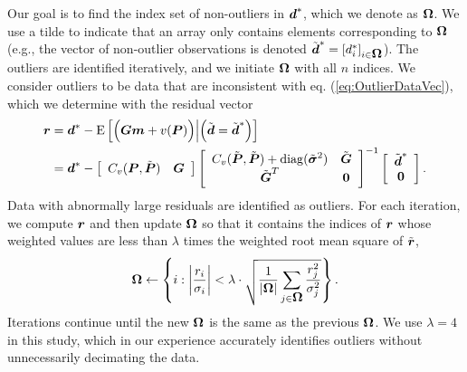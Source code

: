 \documentclass[extra,mreferee]{gji}
\begin{document}
Our goal is to find the index set of non-outliers in $\mitbf{d}^*$, which we denote as $\mitbf{\Omega}$. We use a tilde to indicate that an array only contains elements corresponding to $\mitbf{\Omega}$ (e.g., the vector of non-outlier observations is denoted $\tilde{\mitbf{d}}^* = [d_i^*]_{i \in \mitbf{\Omega}}$). The outliers are identified iteratively, and we initiate $\mitbf{\Omega}$ with all $n$ indices. We consider outliers to be data that are inconsistent with eq. (\ref{eq:OutlierDataVec}), which we determine with the residual vector 
\begin{align}\label{eq:Residual}
\mitbf{r} &= \mitbf{d}^* - \mathrm{E}\left[\Big(\mitbf{G}\mitbf{m} + v(\mitbf{P})\Big) \Big| \Big(\tilde{\mitbf{d}} = \tilde{\mitbf{d}}^*\Big)\right] \\
          &= \mitbf{d}^*  - 
            \left[\begin{array}{cc}
                  C_v(\mitbf{P},\tilde{\mitbf{P}}) & \mitbf{G} \nonumber \\
                  \end{array}\right]
            \left[\begin{array}{cc}
                  C_v(\tilde{\mitbf{P}},\tilde{\mitbf{P}}) + \mathrm{diag}(\tilde{\mitbf{\sigma}}^2) & \tilde{\mitbf{G}} \\
                  \tilde{\mitbf{G}}^T  & \mitbf{0} \\
                  \end{array}\right]^{-1}
            \left[\begin{array}{c}
                  \tilde{\mitbf{d}}^* \\
                  \mitbf{0} \\
                  \end{array}\right].
\end{align}
Data with abnormally large residuals are identified as outliers. For each iteration, we compute $\mitbf{r}$ and then update $\mitbf{\Omega}$ so that it contains the indices of $\mitbf{r}$ whose weighted values are less than $\lambda$ times the weighted root mean square of $\tilde{\mitbf{r}}$, 
\begin{equation}\label{eq:Update}
\mitbf{\Omega} \leftarrow \left\{i : \left|\frac{r_i}{\sigma_i}\right| < \lambda \cdot \sqrt{\frac{1}{|\mitbf{\Omega}|} \sum_{j \in \mitbf{\Omega}} \frac{r_j^2}{\sigma_j^2}} \right\}.
\end{equation} 
Iterations continue until the new $\mitbf{\Omega}$ is the same as the previous $\mitbf{\Omega}$. We use $\lambda=4$ in this study, which in our experience accurately identifies outliers without unnecessarily decimating the data.
\end{document}
